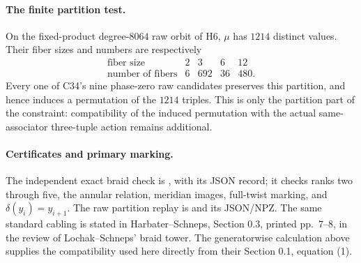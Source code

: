 \paragraph{The finite partition test.}
On the fixed-product degree-$8064$ raw orbit of H6,
$\mu$ has $1214$ distinct values. Their fiber sizes and
numbers are respectively
\[
\begin{array}{c|rrrr}
\text{fiber size}&2&3&6&12\\ \hline
\text{number of fibers}&6&692&36&480.
\end{array}
\]
Every one of C34's nine phase-zero raw candidates preserves
this partition, and hence induces a permutation of the
$1214$ triples. This is only the partition part of the
constraint: compatibility of the induced permutation with
the actual same-associator three-tuple action remains
additional.

\paragraph{Certificates and primary marking.}
The independent exact braid check is
,
with its JSON record; it checks ranks two through five,
the annular relation, meridian images, full-twist marking,
and $\delta(y_i)=y_{i+1}$.
The raw partition replay is
and its JSON/NPZ. The same standard cabling is stated in
Harbater--Schneps, Section 0.3, printed pp.~7--8, in the
review of Lochak--Schneps' braid tower. The generatorwise
calculation above supplies the compatibility used here
directly from their Section 0.1, equation (1).
